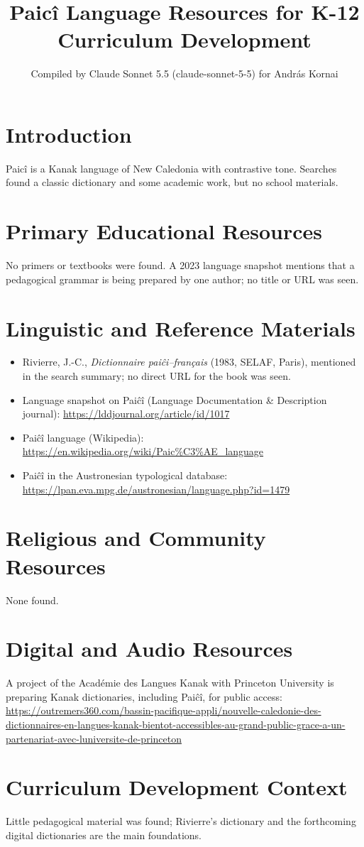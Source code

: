 \documentclass[12pt]{article}
\title{Paic\^i Language Resources for K-12 Curriculum Development}
\author{Compiled by Claude Sonnet 5.5 (claude-sonnet-5-5) for Andr\'as Kornai}
\date{}
\begin{document}
\maketitle
\section{Introduction}
Paic\^i is a Kanak language of New Caledonia with contrastive tone. Searches found a classic dictionary and some academic work, but no school materials.
\section{Primary Educational Resources}
No primers or textbooks were found. A 2023 language snapshot mentions that a pedagogical grammar is being prepared by one author; no title or URL was seen.
\section{Linguistic and Reference Materials}
\begin{itemize}
\item Rivierre, J.-C., \emph{Dictionnaire pai\^ci--fran\c{c}ais} (1983, SELAF, Paris), mentioned in the search summary; no direct URL for the book was seen.
\item Language snapshot on Pai\^c\^i (Language Documentation \& Description journal): \url{https://lddjournal.org/article/id/1017}
\item Pai\^c\^i language (Wikipedia): \url{https://en.wikipedia.org/wiki/Paic%C3%AE_language}
\item Pai\^c\^i in the Austronesian typological database: \url{https://lpan.eva.mpg.de/austronesian/language.php?id=1479}
\end{itemize}
\section{Religious and Community Resources}
None found.
\section{Digital and Audio Resources}
A project of the Acad\'emie des Langues Kanak with Princeton University is preparing Kanak dictionaries, including Pai\^c\^i, for public access: \url{https://outremers360.com/bassin-pacifique-appli/nouvelle-caledonie-des-dictionnaires-en-langues-kanak-bientot-accessibles-au-grand-public-grace-a-un-partenariat-avec-luniversite-de-princeton}
\section{Curriculum Development Context}
Little pedagogical material was found; Rivierre's dictionary and the forthcoming digital dictionaries are the main foundations.
\end{document}
